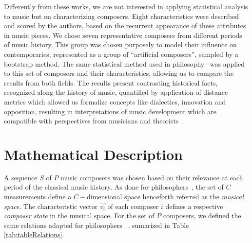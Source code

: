\documentclass[
 aip,
 jmp,
 amsmath,amssymb,
 reprint,
]{revtex4-1}
\begin{document}
Differently from these works, we are not interested in applying
statistical analysis to music but on characterizing composers.
Eight characteristics were described and scored by the authors, based
on the recurrent appearance of these attributes in music pieces.
We chose seven representative composers from different periods of
music history. 
This group was chosen purposely to model their
influence on contemporaries, represented as a group of
``artificial composers'', sampled by a bootstrap
method. %
The same statistical method used in
philosophy~\cite{Fabbri} was applied to this set of composers and their
characteristics, allowing us to compare the results from both fields.
The
results present contrasting historical facts, recognized along
the history of music, quantified by application of
distance metrics which allowed us formalize
concepts like dialectics, innovation and opposition, resulting in
interpretations of music development which are
compatible with perspectives from musicians and
theorists~\cite{Webern, Lovelock}.

\section{Mathematical Description}

A sequence $S$ of $P$ music composers was chosen based on their
relevance at each period of the classical music history.
As done for philosophers~\cite{Fabbri}, the set of $C$ measurements
define a $C-$dimensional space henceforth referred as the \emph{musical space}.  
The characteristic vector $\vec{v_i}$ of each composer $i$ defines a respective
\emph{composer state} in the musical space. For the set of
$P$ composers, we defined the same relations adapted for philosophers
~\cite{Fabbri}, sumarized in Table \ref{tab:tableRelations}. 
\end{document}
